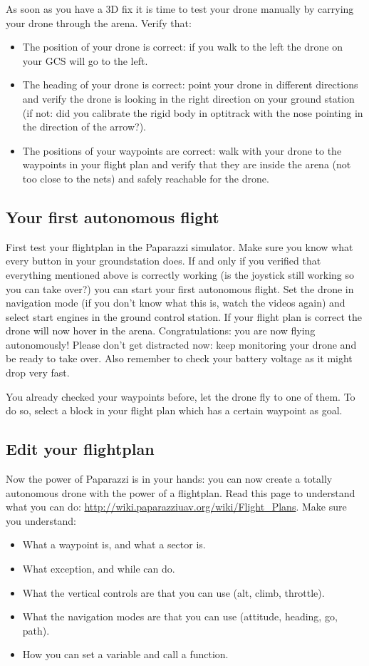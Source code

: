 \documentclass{article}
\begin{document}
As soon as you have a 3D fix it is time to test your drone manually by carrying your drone through the arena. Verify that:
\begin{itemize}
\item The position of your drone is correct: if you walk to the left the drone on your GCS will go to the left.
\item The heading of your drone is correct: point your drone in different directions and verify the drone is looking in the right direction on your ground station (if not: did you calibrate the rigid body in optitrack with the nose pointing in the direction of the arrow?). 
\item The positions of your waypoints are correct: walk with your drone to the waypoints in your flight plan and verify that they are inside the arena (not too close to the nets) and safely reachable for the drone. 
\end{itemize}

\subsection*{Your first autonomous flight}
First test your flightplan in the Paparazzi simulator. Make sure you know what every button in your groundstation does.
If and only if you verified that everything mentioned above is correctly working (is the joystick still working so you can take over?) you can start your first autonomous flight. 
Set the drone in navigation mode (if you don't know what this is, watch the videos again) and select start engines in the ground control station. If your flight plan is correct the drone will now hover in the arena. Congratulations: you are now flying autonomously! Please don't get distracted now: keep monitoring your drone and be ready to take over. Also remember to check your battery voltage as it might drop very fast. 

You already checked your waypoints before, let the drone fly to one of them. To do so, select a block in your flight plan which has a certain waypoint as goal. 
\subsection*{Edit your flightplan}
Now the power of Paparazzi is in your hands: you can now create a totally autonomous drone with the power of a flightplan. Read this page to understand what you can do: \url{http://wiki.paparazziuav.org/wiki/Flight_Plans}. 
Make sure you understand:
\begin{itemize}
	\item What a waypoint is, and what a sector is. 
	\item What exception, and while can do. 
	\item What the vertical controls are that you can use (alt, climb, throttle).
	\item What the navigation modes are that you can use (attitude, heading, go, path). 
	\item How you can set a variable and call a function. 
\end{itemize}
\end{document}
